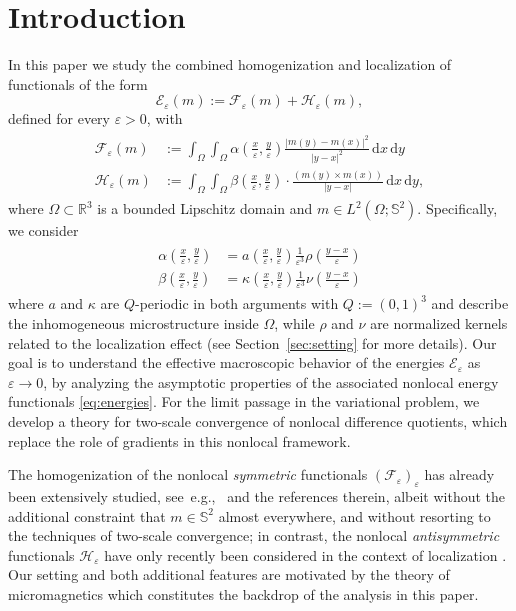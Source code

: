 \documentclass[reqno,11pt]{amsart}
\numberwithin{equation}{section}
\theoremstyle{thmlemcorr}
\numberwithin{theorem}{section}
\theoremstyle{thmlemcorr*}
\theoremstyle{defi}
\theoremstyle{remexample}
\theoremstyle{ass}
\newcommand{\R}{\mathbb{R}}
\renewcommand{\S}{\mathbb{S}}
\newcommand{\Ecal}{\mathcal{E}}
\newcommand{\Fcal}{\mathcal{F}}
\newcommand{\Hcal}{\mathcal{H}}
\renewcommand{\epsilon}{\varepsilon}
\newcommand{\dd}{\,\mathrm{d}}
\newcommand{\1}{\mathds{1}}
\newcommand{\Om}{\Omega}
\newcommand{\veps}{\varepsilon}
\begin{document}
\section{Introduction}\label{sec:intro}
In this paper we study the combined homogenization and localization of functionals of the form
\[
\Ecal_\epsilon(m):= \Fcal_\epsilon(m)+\Hcal_\epsilon(m),
\]
defined for every $\veps > 0$, with
\begin{align}
\begin{split}\label{eq:energies}
      \Fcal_\epsilon(m)&:=\int_\Omega\int_\Omega \alpha\left(\frac{x}{\epsilon},\frac{y}{\epsilon}\right) \frac{|m(y)-m(x)|^2}{|y-x|^2}\dd x\dd y \\
    \Hcal_\epsilon(m)&:=\int_\Omega\int_\Omega \beta\left(\frac{x}{\epsilon},\frac{y}{\epsilon}\right)\cdot\frac{(m(y)\times m(x))}{|y-x|}\dd x\dd y,
\end{split}
\end{align}
where $\Omega \subset \R^3$ is a bounded Lipschitz domain and $m \in L^2(\Omega;\S^{2})$. Specifically, we consider
\begin{align}
\begin{split}\label{eq:coeff}
\alpha\left(\frac{x}{\epsilon},\frac{y}{\epsilon}\right) &= a\left(\frac{x}{\epsilon},\frac{y}{\epsilon}\right) \frac{1}{\epsilon^3}\rho\left(\frac{y-x}{\epsilon}\right)\\
\beta\left(\frac{x}{\epsilon},\frac{y}{\epsilon}\right) &= \kappa\left(\frac{x}{\epsilon},\frac{y}{\epsilon}\right)  \frac{1}{\epsilon^3}\nu\left(\frac{y-x}{\epsilon}\right)
\end{split}
\end{align}
where $a$ and $\kappa$ are $Q$-periodic in both arguments with $Q:=(0,1)^3$ and describe the inhomogeneous microstructure inside $\Om$, while $\rho$ and $\nu$ are normalized kernels related to the localization effect (see Section~\ref{sec:setting} for more details). Our goal is to understand the effective macroscopic behavior of the energies $\Ecal_\epsilon$ as 
$\veps \to 0$, by analyzing the asymptotic properties of the associated nonlocal energy functionals \eqref{eq:energies}.
For the limit passage in the variational problem, we develop a theory for two-scale convergence of nonlocal difference quotients, which replace the role of gradients in this nonlocal framework.

The homogenization of the nonlocal \textit{symmetric} functionals $(\Fcal_\epsilon)_\epsilon$ has already been extensively studied, see~e.g.,~\cite{AAB23} and the references therein, albeit without the additional constraint that $m \in \S^2$ almost everywhere, and without resorting to the techniques of two-scale convergence; in contrast, the nonlocal \textit{antisymmetric} functionals $\Hcal_\epsilon$ have only recently been considered in the context of localization \cite{DDG24}. Our setting and both additional features are motivated by the theory of micromagnetics which constitutes the backdrop of the analysis in this paper. 
\end{document}
